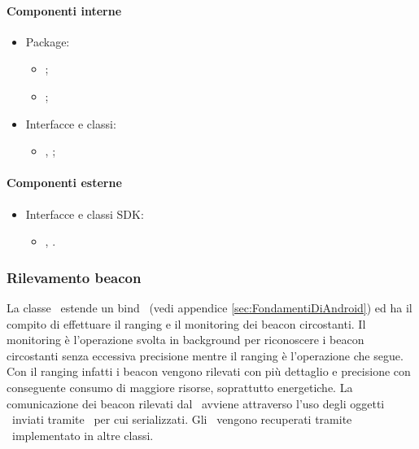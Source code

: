 \documentclass[../Funzionalita.tex]{subfiles}
\begin{document}
			\paragraph*{Componenti interne}
			\begin{itemize}
			
				\item Package:
				\begin{itemize}
					\item[] \view;
					\item[] \presenter;
				\end{itemize}
				
				\item Interfacce e classi:
				\begin{itemize}
					\item[] \HomeActivity, \HomeView;
				\end{itemize}
				
			\end{itemize}
			
			
			\paragraph*{Componenti esterne}
			
			\begin{itemize}
				\item Interfacce e classi SDK:
				\begin{itemize}
					\item[] \Activity, \InformationManager.
				\end{itemize}
			\end{itemize}
			
		\newpage	
		\subsubsection{Rilevamento beacon}
			La classe \BeaconManagerAdapter\ estende un bind \Service\ (vedi appendice \ref{sec:FondamentiDiAndroid}) ed ha il compito di effettuare il \gls{ranging} e il \gls{monitoring} dei \gls{beacon} circostanti. Il \gls{monitoring} è l'operazione svolta in background per riconoscere i \gls{beacon} 
circostanti senza eccessiva precisione mentre il \gls{ranging} è l'operazione che segue. Con il \gls{ranging} infatti i beacon vengono rilevati con più dettaglio e precisione con conseguente consumo di maggiore risorse, soprattutto energetiche.
			La comunicazione dei \gls{beacon} rilevati dal \model\ avviene attraverso l'uso degli oggetti \MyBeacon\ inviati tramite \Intent\ per cui serializzati. Gli \Intent\ vengono recuperati tramite \BroadcastReceiver\ implementato in altre classi.
			
\end{document}
